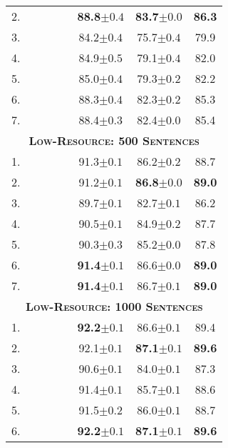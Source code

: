 \documentclass[11pt,a4paper]{article}
\newcommand{\cmark}{\textcolor{blue}{\ding{51}}}
\newcommand{\xmark}{\textcolor{red}{\ding{55}}}
\begin{document}
\begin{table}[]
\begin{tabular}{l|cccc||cc|c}
2. & \xmark & \cmark & \cmark & \xmark & \textbf{88.8}$\pm0.4$ & \textbf{83.7}$\pm0.0$ & \textbf{86.3} \\
3. & \cmark & \xmark & \xmark & \xmark & 84.2$\pm0.4$ & 75.7$\pm0.4$ & 79.9 \\
4. & \cmark & \xmark & \cmark & \xmark & 84.9$\pm0.5$ & 79.1$\pm0.4$ & 82.0 \\
5. & \cmark & \xmark & \cmark & \cmark & 85.0$\pm0.4$ & 79.3$\pm0.2$ & 82.2 \\
6. & \cmark & \cmark & \cmark & \xmark & 88.3$\pm0.4$ & 82.3$\pm0.2$ & 85.3 \\
7. & \cmark & \cmark & \cmark & \cmark & 88.4$\pm0.3$ & 82.4$\pm0.0$ & 85.4 \\
\hline\hline
\multicolumn{8}{c}{\bf \textsc{Low-Resource: 500 Sentences}}\\
\hline
1. & \xmark & \cmark & \xmark & \xmark & 91.3$\pm0.1$ & 86.2$\pm0.2$ & 88.7 \\
2. & \xmark & \cmark & \cmark & \xmark & 91.2$\pm0.1$ & \textbf{86.8}$\pm0.0$ & \textbf{89.0} \\
3. & \cmark & \xmark & \xmark & \xmark & 89.7$\pm0.1$ & 82.7$\pm0.1$ & 86.2 \\
4. & \cmark & \xmark & \cmark & \xmark & 90.5$\pm0.1$ & 84.9$\pm0.2$ & 87.7 \\
5. & \cmark & \xmark & \cmark & \cmark & 90.3$\pm0.3$ & 85.2$\pm0.0$ & 87.8 \\
6. & \cmark & \cmark & \cmark & \xmark & \textbf{91.4}$\pm0.1$ & 86.6$\pm0.0$ & \textbf{89.0} \\
7. & \cmark & \cmark & \cmark & \cmark & \textbf{91.4}$\pm0.1$ & 86.7$\pm0.1$ & \textbf{89.0} \\
\hline\hline
\multicolumn{8}{c}{\bf \textsc{Low-Resource: 1000 Sentences}}\\
\hline
1. & \xmark & \cmark & \xmark & \xmark & \textbf{92.2}$\pm0.1$ & 86.6$\pm0.1$ & 89.4 \\
2. & \xmark & \cmark & \cmark & \xmark & 92.1$\pm0.1$ & \textbf{87.1}$\pm0.1$ & \textbf{89.6} \\
3. & \cmark & \xmark & \xmark & \xmark & 90.6$\pm0.1$ & 84.0$\pm0.1$ & 87.3 \\
4. & \cmark & \xmark & \cmark & \xmark & 91.4$\pm0.1$ & 85.7$\pm0.1$ & 88.6 \\
5. & \cmark & \xmark & \cmark & \cmark & 91.5$\pm0.2$ & 86.0$\pm0.1$ & 88.7 \\
6. & \cmark & \cmark & \cmark & \xmark & \textbf{92.2}$\pm0.1$ & \textbf{87.1}$\pm0.1$ & \textbf{89.6} \\

\end{tabular}
\end{table}
\end{document}
